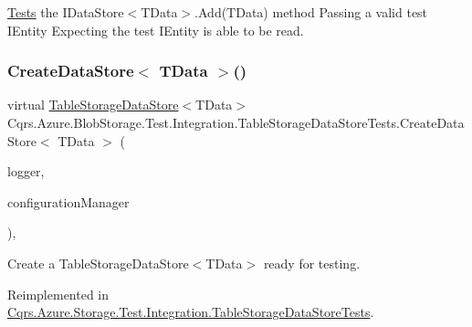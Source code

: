 \hyperlink{namespaceCqrs_1_1Tests}{Tests} the I\+Data\+Store$<$\+T\+Data$>$.\+Add(\+T\+Data) method Passing a valid test I\+Entity Expecting the test I\+Entity is able to be read. 

\mbox{\label{classCqrs_1_1Azure_1_1BlobStorage_1_1Test_1_1Integration_1_1TableStorageDataStoreTests_a76d6ef854f24e39f80de66e86cfa967c_a76d6ef854f24e39f80de66e86cfa967c}} 
\subsubsection{\texorpdfstring{Create\+Data\+Store$<$ T\+Data $>$()}{CreateDataStore< TData >()}}
{\footnotesize\ttfamily virtual \hyperlink{classCqrs_1_1Azure_1_1BlobStorage_1_1DataStores_1_1TableStorageDataStore}{Table\+Storage\+Data\+Store}$<$T\+Data$>$ Cqrs.\+Azure.\+Blob\+Storage.\+Test.\+Integration.\+Table\+Storage\+Data\+Store\+Tests.\+Create\+Data\+Store$<$ T\+Data $>$ (\begin{DoxyParamCaption}\item[{I\+Logger}]{logger,  }\item[{\hyperlink{interfaceCqrs_1_1Configuration_1_1IConfigurationManager}{I\+Configuration\+Manager}}]{configuration\+Manager }\end{DoxyParamCaption})\hspace{0.3cm}{\ttfamily [protected]}, {\ttfamily [virtual]}}



Create a Table\+Storage\+Data\+Store$<$\+T\+Data$>$ ready for testing. 



Reimplemented in \hyperlink{classCqrs_1_1Azure_1_1Storage_1_1Test_1_1Integration_1_1TableStorageDataStoreTests_a4c23960b33f58ea56707d736616a9f53_a4c23960b33f58ea56707d736616a9f53}{Cqrs.\+Azure.\+Storage.\+Test.\+Integration.\+Table\+Storage\+Data\+Store\+Tests}.

